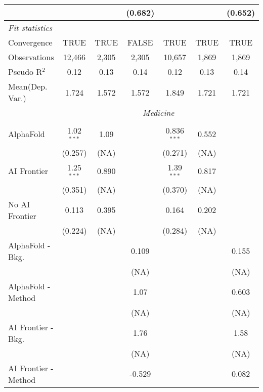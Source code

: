 \begin{tabular}{lcccccc}
                           &               &       & (0.682)      &               &             & (0.652)\\   
   \midrule
   \emph{Fit statistics}\\
   Convergence             &TRUE           & TRUE  & FALSE        & TRUE          & TRUE        & TRUE\\  
   Observations            & 12,466        & 2,305 & 2,305        & 10,657        & 1,869       & 1,869\\  
   Pseudo R$^2$            & 0.12          & 0.13  & 0.14         & 0.12          & 0.13        & 0.14\\  
   
Mean(Dep. Var.) & 1.724 & 1.572 & 1.572 & 1.849 & 1.721 & 1.721 \\
 & \multicolumn{6}{c}{\textit{Medicine}} \\ \\
   AlphaFold               & 1.02$^{***}$ & 1.09  &        & 0.836$^{***}$ & 0.552 &   \\   
                           & (0.257)      & (NA)  &        & (0.271)       & (NA)  &   \\   
   AI Frontier             & 1.25$^{***}$ & 0.890 &        & 1.39$^{***}$  & 0.817 &   \\   
                           & (0.351)      & (NA)  &        & (0.370)       & (NA)  &   \\   
   No AI Frontier          & 0.113        & 0.395 &        & 0.164         & 0.202 &   \\   
                           & (0.224)      & (NA)  &        & (0.284)       & (NA)  &   \\   
   AlphaFold - Bkg.        &              &       & 0.109  &               &       & 0.155\\   
                           &              &       & (NA)   &               &       & (NA)\\   
   AlphaFold - Method      &              &       & 1.07   &               &       & 0.603\\   
                           &              &       & (NA)   &               &       & (NA)\\   
   AI Frontier - Bkg.      &              &       & 1.76   &               &       & 1.58\\   
                           &              &       & (NA)   &               &       & (NA)\\   
   AI Frontier - Method    &              &       & -0.529 &               &       & 0.082\\   

\end{tabular}

